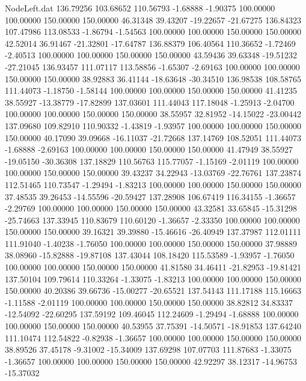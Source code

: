 \begin{filecontents}{NodeLeft.dat}
 136.79256  103.68652  110.56793    -1.68888   -1.90375  100.00000  100.00000  150.00000  150.00000   46.31348   39.43207  -19.22657  -21.67275
 136.84323  107.47986  113.08533    -1.86794   -1.54563  100.00000  100.00000  150.00000  150.00000   42.52014   36.91467  -21.32801  -17.64787
 136.88379  106.40564  110.36652    -1.72469   -2.40513  100.00000  100.00000  150.00000  150.00000   43.59436   39.63348  -19.51232  -27.21045
 136.93457  111.07117  113.58856    -1.65307   -2.69163  100.00000  100.00000  150.00000  150.00000   38.92883   36.41144  -18.63648  -30.34510
 136.98538  108.58765  111.44073    -1.18750   -1.58144  100.00000  100.00000  150.00000  150.00000   41.41235   38.55927  -13.38779  -17.82899
 137.03601  111.44043  117.18048    -1.25913   -2.04700  100.00000  100.00000  150.00000  150.00000   38.55957   32.81952  -14.15022  -23.00442
 137.09680  109.82910  110.90332    -1.43819   -1.93957  100.00000  100.00000  150.00000  150.00000   40.17090   39.09668  -16.11037  -21.72668
 137.14769  108.52051  111.44073    -1.68888   -2.69163  100.00000  100.00000  150.00000  150.00000   41.47949   38.55927  -19.05150  -30.36308
 137.18829  110.56763  115.77057    -1.15169   -2.01119  100.00000  100.00000  150.00000  150.00000   39.43237   34.22943  -13.03769  -22.76761
 137.23874  112.51465  110.73547    -1.29494   -1.83213  100.00000  100.00000  150.00000  150.00000   37.48535   39.26453  -14.55596  -20.59427
 137.28908  106.67419  116.34155    -1.36657   -2.29769  100.00000  100.00000  150.00000  150.00000   43.32581   33.65845  -15.31298  -25.74663
 137.33945  110.83679  110.60120    -1.36657   -2.33350  100.00000  100.00000  150.00000  150.00000   39.16321   39.39880  -15.46616  -26.40949
 137.37987  112.01111  111.91040    -1.40238   -1.76050  100.00000  100.00000  150.00000  150.00000   37.98889   38.08960  -15.82888  -19.87108
 137.43044  108.18420  115.53589    -1.93957   -1.76050  100.00000  100.00000  150.00000  150.00000   41.81580   34.46411  -21.82953  -19.81421
 137.50104  109.79614  110.33264    -1.33075   -1.83213  100.00000  100.00000  150.00000  150.00000   40.20386   39.66736  -15.00277  -20.65521
 137.54143  111.17188  115.16663    -1.11588   -2.01119  100.00000  100.00000  150.00000  150.00000   38.82812   34.83337  -12.54092  -22.60295
 137.59192  109.46045  112.24609    -1.29494   -1.68888  100.00000  100.00000  150.00000  150.00000   40.53955   37.75391  -14.50571  -18.91853
 137.64240  111.10474  112.54822    -0.82938   -1.36657  100.00000  100.00000  150.00000  150.00000   38.89526   37.45178   -9.31002  -15.34009
 137.69298  107.07703  111.87683    -1.33075   -1.36657  100.00000  100.00000  150.00000  150.00000   42.92297   38.12317  -14.96753  -15.37032

\end{filecontents}
